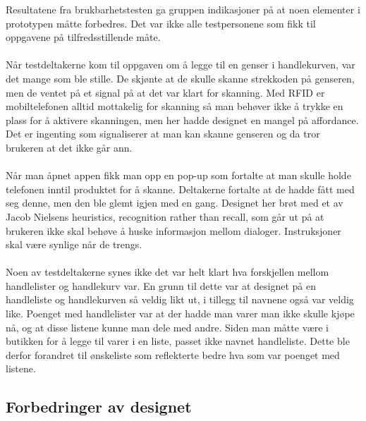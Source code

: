 Resultatene fra brukbarhetstesten ga gruppen indikasjoner på at noen elementer i prototypen måtte forbedres. Det var ikke alle testpersonene som fikk til oppgavene på tilfredsstillende måte.
\\\\
Når testdeltakerne kom til oppgaven om å legge til en genser i handlekurven, var det mange som ble stille. De skjønte at de skulle skanne strekkoden på genseren, men de ventet på et signal på at det var klart for skanning. Med RFID er mobiltelefonen alltid mottakelig for skanning så man behøver ikke å trykke en plass for å aktivere skanningen, men her hadde designet en mangel på affordance. Det er ingenting som signaliserer at man kan skanne genseren og da tror brukeren at det ikke går ann. 
\\\\
Når man åpnet appen fikk man opp en pop-up som fortalte at man skulle holde telefonen inntil produktet for å skanne. Deltakerne fortalte at de hadde fått med seg denne, men den ble glemt igjen med en gang. Designet her brøt med et av Jacob Nielsens heuristics, recognition rather than recall, som går ut på at brukeren ikke skal behøve å huske informasjon mellom dialoger. Instruksjoner skal være synlige når de trengs\cite[p.~404]{preece}. 
\\\\
Noen av testdeltakerne synes ikke det var helt klart hva forskjellen mellom handlelister og handlekurv var. En grunn til dette var at designet på en handleliste og handlekurven så veldig likt ut, i tillegg til navnene også var veldig like. Poenget med handlelister var at der hadde man varer man ikke skulle kjøpe nå, og at disse listene kunne man dele med andre. Siden man måtte være i butikken for å legge til varer i en liste, passet ikke navnet handleliste. Dette ble derfor forandret til ønskeliste som reflekterte bedre hva som var poenget med listene. 


\subsection{Forbedringer av designet}

